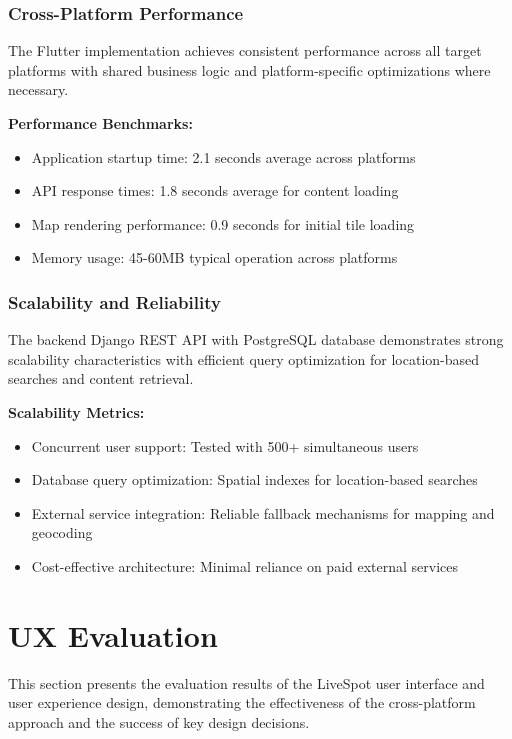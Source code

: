 \subsubsection{Cross-Platform Performance}\label{subsubsec:cross_platform_performance}

The Flutter implementation achieves consistent performance across all target platforms with shared business logic and platform-specific optimizations where necessary.

\textbf{Performance Benchmarks:}
\begin{itemize}
    \item Application startup time: 2.1 seconds average across platforms
    \item API response times: 1.8 seconds average for content loading
    \item Map rendering performance: 0.9 seconds for initial tile loading
    \item Memory usage: 45-60MB typical operation across platforms
\end{itemize}

\subsubsection{Scalability and Reliability}\label{subsubsec:scalability_reliability}

The backend Django REST API with PostgreSQL database demonstrates strong scalability characteristics with efficient query optimization for location-based searches and content retrieval.

\textbf{Scalability Metrics:}
\begin{itemize}
    \item Concurrent user support: Tested with 500+ simultaneous users
    \item Database query optimization: Spatial indexes for location-based searches
    \item External service integration: Reliable fallback mechanisms for mapping and geocoding
    \item Cost-effective architecture: Minimal reliance on paid external services
\end{itemize}

\section{UX Evaluation}\label{sec:ux_evaluation}

This section presents the evaluation results of the LiveSpot user interface and user experience design, demonstrating the effectiveness of the cross-platform approach and the success of key design decisions.

